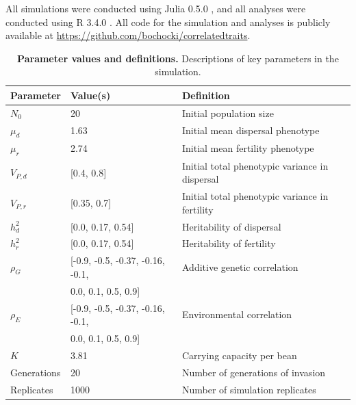 \documentclass[11pt]{article}
\begin{document}
All simulations were conducted using Julia 0.5.0 \citep{bezanson_julia:_2017}, and all analyses were conducted using R 3.4.0 \citep{r_core_team_r:_2015}.
All code for the simulation and analyses is publicly available at \url{https://github.com/bochocki/correlatedtraits}.

\renewcommand{\thetable}{A\arabic{table}}
\setcounter{table}{0}
\begin{table}[h]
\centering
\label{Parameter values and definitions}
\caption[Parameter values and definitions]{\textbf{Parameter values and definitions.} Descriptions of key parameters in the simulation.}\label{corr:params}\vspace{0.1in}
\begin{tabularx}{0.95\linewidth}{llX}
\toprule
Parameter    & Value(s)                               & Definition                                        \\ \midrule
$N_{0}$      & 20                                     & Initial population size                           \\
$\mu_{d}$    & 1.63                                   & Initial mean dispersal phenotype   \\
$\mu_{r}$    & 2.74                                   & Initial mean fertility phenotype
\\
$V_{P,d}$    & [0.4, 0.8]                                   & Initial total phenotypic variance in dispersal \\
$V_{P,r}$    & [0.35, 0.7]                                   & Initial total phenotypic variance in fertility \\
$h^{2}_{d}$  & [0.0, 0.17, 0.54]                                   & Heritability of dispersal                  \\
$h^{2}_{r}$  & [0.0, 0.17, 0.54]                                   & Heritability of fertility                \\
$\rho_{G}$   & [-0.9, -0.5, -0.37, -0.16, -0.1,       & Additive genetic correlation          \\
             & \phantom{$[-$}0.0, 0.1, 0.5, 0.9]      &                                                   \\
$\rho_{E}$   & [-0.9, -0.5, -0.37, -0.16, -0.1,       & Environmental correlation             \\
             & \phantom{$[-$}0.0, 0.1, 0.5, 0.9]      &                                                   \\
$K$          & 3.81                                   & Carrying capacity per bean                          \\
Generations  & 20                                     & Number of generations of invasion                 \\
Replicates   & 1000                                   & Number of simulation replicates                   \\ \bottomrule
\end{tabularx}
\end{table}
\end{document}
